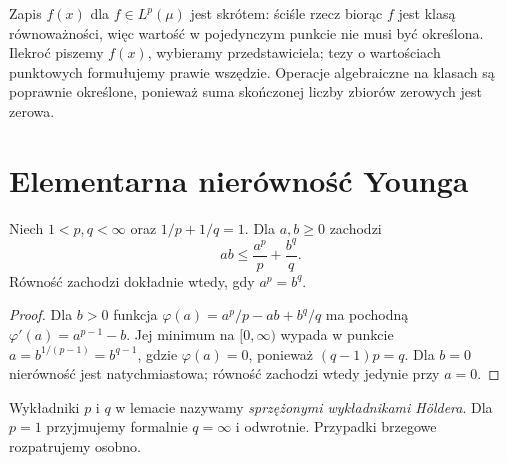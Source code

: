 \begin{uwaga}
Zapis $f(x)$ dla $f\in L^p(\mu)$ jest skrótem:
ściśle rzecz biorąc $f$ jest klasą równoważności, więc
wartość w pojedynczym punkcie nie musi być określona.
Ilekroć piszemy $f(x)$, wybieramy przedstawiciela;
tezy o wartościach punktowych formułujemy prawie wszędzie.
Operacje algebraiczne na klasach są poprawnie określone,
ponieważ suma skończonej liczby zbiorów zerowych jest zerowa.
\end{uwaga}

\section{Elementarna nierówność Younga}

\begin{lemat}
\label{lem:young-numbers-14}
Niech $1<p,q<\infty$ oraz $1/p+1/q=1$.
Dla $a,b\ge0$ zachodzi
\begin{equation}\label{eq:young-14}
ab\le\frac{a^p}{p}+\frac{b^q}{q}.
\end{equation}
Równość zachodzi dokładnie wtedy, gdy $a^p=b^q$.
\end{lemat}
\begin{proof}
Dla $b>0$ funkcja $\varphi(a)=a^p/p-ab+b^q/q$
ma pochodną $\varphi'(a)=a^{p-1}-b$.
Jej minimum na $[0,\infty)$ wypada w punkcie
$a=b^{1/(p-1)}=b^{q-1}$, gdzie
$\varphi(a)=0$, ponieważ $(q-1)p=q$.
Dla $b=0$ nierówność jest natychmiastowa;
równość zachodzi wtedy jedynie przy $a=0$.
\end{proof}

\begin{uwaga}
Wykładniki $p$ i $q$ w lemacie nazywamy
\emph{sprzężonymi wykładnikami Höldera}.
Dla $p=1$ przyjmujemy formalnie $q=\infty$ i odwrotnie.
Przypadki brzegowe rozpatrujemy osobno.
\end{uwaga}

